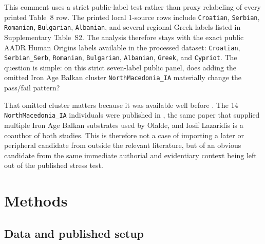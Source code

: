 \documentclass[11pt]{article}
\begin{document}
This comment uses a strict public-label test rather than proxy relabeling of
every printed Table~8 row. The printed local 1-source rows include
\texttt{Croatian}, \texttt{Serbian}, \texttt{Romanian}, \texttt{Bulgarian},
\texttt{Albanian}, and several regional Greek labels listed in Supplementary
Table~S2. The analysis therefore stays with the exact public AADR Human
Origins labels available in the processed dataset: \texttt{Croatian},
\texttt{Serbian\_Serb}, \texttt{Romanian}, \texttt{Bulgarian},
\texttt{Albanian}, \texttt{Greek}, and \texttt{Cypriot}. The question is
simple: on this strict seven-label public panel, does adding the omitted Iron
Age Balkan cluster \texttt{NorthMacedonia\_IA} materially change the pass/fail
pattern?

That omitted cluster matters because it was available well before
\citet{Olalde2023}. The 14 \texttt{NorthMacedonia\_IA} individuals were
published in \citet{Lazaridis2022}, the same paper that supplied multiple
Iron Age Balkan substrates used by Olalde, and Iosif Lazaridis is a coauthor
of both studies. This is therefore not a case of importing a later or
peripheral candidate from outside the relevant literature, but of an obvious
candidate from the same immediate authorial and evidentiary context being left
out of the published stress test.

\section{Methods}

\subsection{Data and published setup}
\end{document}

